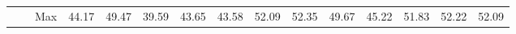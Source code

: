 \documentclass[fleqn,10pt]{wlscirep}
\begin{document}
\begin{table}[htb]
{\begin{tabular}{lll|clll|clllllll|}
\multicolumn{1}{|l|}{}                              & \multicolumn{1}{l|}{}                                                                                    & Max & \multicolumn{1}{c|}{44.17}                                                 & \multicolumn{1}{c|}{49.47}                                                 & \multicolumn{1}{c|}{39.59}                                                 & \multicolumn{1}{c|}{43.65}                                                 & \multicolumn{1}{c|}{43.58}                                                 & \multicolumn{1}{c|}{52.09}                                                 & \multicolumn{1}{c|}{52.35}                                                 & \multicolumn{1}{c|}{49.67}                                                 & \multicolumn{1}{c|}{45.22}                                                 & \multicolumn{1}{c|}{51.83}                                                 & \multicolumn{1}{c|}{52.22}                                                 & \multicolumn{1}{c|}{52.09}                                                 \\ \cline{2-15} 

\end{tabular}}
\end{table}
\end{document}
